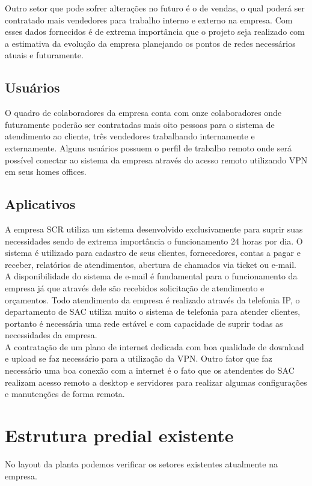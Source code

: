 \documentclass[	DIV=calc,%
							paper=a4,%
							fontsize=12pt,%
							onecolumn]{scrartcl}	 					%
\begin{document}
Outro setor que pode sofrer alterações no futuro é o de vendas, o qual poderá ser contratado mais vendedores para trabalho interno e externo na empresa. Com esses dados fornecidos é de extrema importância que o projeto seja realizado com a estimativa da evolução da empresa planejando os pontos de redes necessários atuais e futuramente.
 

\subsection{Usuários}
O quadro de colaboradores da empresa conta com onze colaboradores onde futuramente poderão ser contratadas mais oito pessoas para o sistema de atendimento ao cliente, três vendedores trabalhando internamente e externamente. Alguns usuários possuem o perfil de trabalho remoto onde será possível conectar ao sistema da empresa através do acesso remoto utilizando VPN em seus homes offices.

\subsection{Aplicativos}
A empresa SCR utiliza um sistema desenvolvido exclusivamente para suprir suas necessidades sendo de extrema importância o funcionamento 24 horas por dia. O sistema é utilizado para cadastro de seus clientes, fornecedores, contas a pagar e receber, relatórios de atendimentos, abertura de chamados via ticket ou e-mail.
\\

A disponibilidade do sistema de e-mail é fundamental para o funcionamento da empresa já que através dele são recebidos solicitação de atendimento e orçamentos. Todo atendimento da empresa é realizado através da telefonia IP, o departamento de SAC utiliza muito o sistema de telefonia para atender clientes, portanto é necessária uma rede estável e com capacidade de suprir todas as necessidades da empresa. 
\\

A contratação de um plano de internet dedicada com boa qualidade de download e upload se faz necessário para a utilização da VPN. Outro fator que faz necessário uma boa conexão com a internet é o fato que os atendentes do SAC realizam acesso remoto a desktop e servidores para realizar algumas configurações e manutenções de forma remota.


\section{Estrutura predial existente}
No layout da planta podemos verificar os setores existentes atualmente na empresa.
\end{document}
